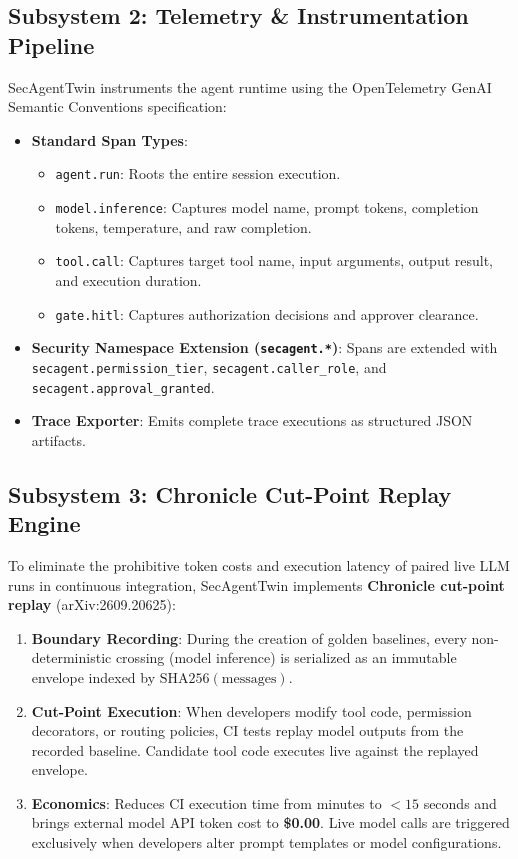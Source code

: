 \documentclass[11pt,a4paper]{article}
\begin{document}
\subsection{Subsystem 2: Telemetry \& Instrumentation Pipeline}
SecAgentTwin instruments the agent runtime using the OpenTelemetry GenAI Semantic Conventions specification:
\begin{itemize}[leftmargin=1.5em,noitemsep]
    \item \textbf{Standard Span Types}:
    \begin{itemize}[noitemsep]
        \item \texttt{agent.run}: Roots the entire session execution.
        \item \texttt{model.inference}: Captures model name, prompt tokens, completion tokens, temperature, and raw completion.
        \item \texttt{tool.call}: Captures target tool name, input arguments, output result, and execution duration.
        \item \texttt{gate.hitl}: Captures authorization decisions and approver clearance.
    \end{itemize}
    \item \textbf{Security Namespace Extension (\texttt{secagent.*})}:
    Spans are extended with \texttt{secagent.permission\_tier}, \texttt{secagent.caller\_role}, and \texttt{secagent.approval\_granted}.
    \item \textbf{Trace Exporter}: Emits complete trace executions as structured JSON artifacts.
\end{itemize}

\subsection{Subsystem 3: Chronicle Cut-Point Replay Engine}
To eliminate the prohibitive token costs and execution latency of paired live LLM runs in continuous integration, SecAgentTwin implements \textbf{Chronicle cut-point replay} (arXiv:2609.20625):
\begin{enumerate}[leftmargin=1.5em,noitemsep]
    \item \textbf{Boundary Recording}: During the creation of golden baselines, every non-deterministic crossing (model inference) is serialized as an immutable envelope indexed by $\text{SHA256}(\text{messages})$.
    \item \textbf{Cut-Point Execution}: When developers modify tool code, permission decorators, or routing policies, CI tests replay model outputs from the recorded baseline. Candidate tool code executes live against the replayed envelope.
    \item \textbf{Economics}: Reduces CI execution time from minutes to $<15$ seconds and brings external model API token cost to \textbf{\$0.00}. Live model calls are triggered exclusively when developers alter prompt templates or model configurations.
\end{enumerate}
\end{document}
